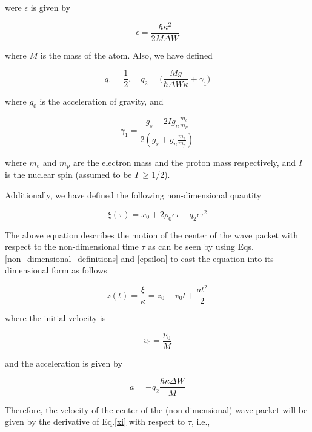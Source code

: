 \documentclass{article}
\begin{document}
were $\epsilon$ is given by 

\begin{equation}\label{epsilon}
\epsilon = \frac{\hbar \kappa^{2}}{2 M \Delta W}
\end{equation}

where $M$ is the mass of the atom. Also, we have defined

\begin{equation}\label{q1_q2}
q_{1} = \frac{1}{2} \mathrm{,}\quad q_{2} = \bigg(\frac{M g}{\hbar \Delta W \kappa} \pm  \gamma_{1} \bigg)
\end{equation}

where $g_{0}$ is the acceleration of gravity, and 

\begin{equation}\label{gamma_1}
\gamma_{1} = \frac{g_{s}-2 I g_{n} \frac{m_{e}}{m_{p}}}{2(g_{s}+g_{n}\frac{m_{e}}{m_{p}})}
\end{equation}

where $m_{e}$ and $m_{p}$ are the electron mass and the proton mass respectively, and $I$ is the nuclear spin (assumed to be $I\ \ge 1/2$).

Additionally, we have defined the following non-dimensional quantity

\begin{equation}\label{xi}
\xi(\tau) = x_{0} + 2 \rho_{0} \epsilon \tau - q_{2}\epsilon \tau^{2}
\end{equation}

The above equation describes the motion of the center of the wave packet with respect to the non-dimensional time $\tau$ as can be seen by using Eqs.\ref{non_dimensional_definitions} and \ref{epsilon} to cast the equation into its dimensional form as follows

\begin{equation}\label{xi_dimensional}
z(t) = \frac{\xi}{\kappa} = z_{0} +  v_{0} t +  \frac{a t^{2}}{2}
\end{equation}

where the initial velocity is

\begin{equation}
v_{0} = \frac{p_{0}}{M}
\end{equation}

and the acceleration is given by

\begin{equation}
a = -q_{2} \frac{ \hbar \kappa \Delta W}{M}
\end{equation}

Therefore, the velocity of the center of the (non-dimensional) wave packet will be given by the derivative of Eq.\ref{xi} with respect to $\tau$, i.e.,
\end{document}
